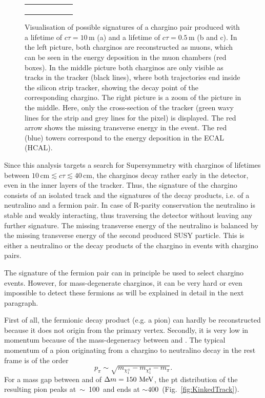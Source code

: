 \begin{figure}[!b]
\begin{tabular}{c}
\begin{subfigure}{0.31\textwidth}
      \caption{}
  \end{subfigure} 
  \end{tabular}
  \caption{Visualisation of possible signatures of a chargino pair produced with a lifetime of $c\tau = 10\,\text{m}$ (a) and a lifetime of $c\tau = 0.5\,\text{m}$ (b and c). 
           In the left picture, both charginos are reconstructed as muons, which can be seen in the energy deposition in the muon chambers (red boxes). 
           In the middle picture both charginos are only visible as tracks in the tracker (black lines), where both trajectories end inside the silicon strip tracker, showing the decay point of the corresponding chargino. 
           The right picture is a zoom of the picture in the middle. Here, only the cross-section of the tracker (green wavy lines for the strip and grey lines for the pixel) is displayed. The red arrow shows the missing transverse energy in the event.
           The red (blue) towers correspond to the energy deposition in the ECAL (HCAL).} 
  \label{fig:CharginoPaiEventDisplay}
\end{figure}

Since this analysis targets a search for Supersymmetry with charginos of lifetimes between $10\,\text{cm} \lesssim c\tau \lesssim  40\,\text{cm}$, the charginos decay rather early in the detector, even in the inner layers of the tracker. 
Thus, the signature of the chargino consists of an isolated track and the signatures of the decay products, i.e. of a neutralino and a fermion pair. 
In case of R-parity conservation the neutralino is stable and weakly interacting, thus traversing the detector without leaving any further signature.
The missing transverse energy of the neutralino is balanced by the missing transverse energy of the second produced SUSY particle.
This is either a neutralino or the decay products of the chargino in events with chargino pairs. 

The signature of the fermion pair can in principle be used to select chargino events. 
However, for mass-degenerate charginos, it can be very hard or even impossible to detect these fermions as will be explained in detail in the next paragraph.

First of all, the fermionic decay product (e.g. a pion) can hardly be reconstructed because it does not origin from the primary vertex.
Secondly, it is very low in momentum because of the mass-degeneracy between \chipm and \chiO.
The typical momentum of a pion originating from a chargino to neutralino decay in the \chipm rest frame is of the order 
\begin{equation*}
p_{\pi}\sim \sqrt{m_{\chi^{\pm}_1}-m_{\chi^{0}_1}-m_{\pi}}.
\end{equation*}
For a mass gap between \chipm and \chiO of $\Delta m=150\, \,\text{Me}\kern-0.06667em\text{V}$, the pt distribution of the resulting pion peaks \mbox{at $\sim$ 100\,\mev} and ends at \mbox{\pt $\sim 400\,$\mev} (Fig.~\ref{fig:KinkedTrack}).

